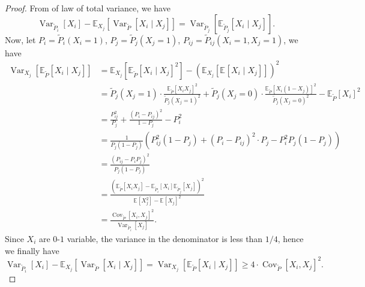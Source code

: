 \begin{proof}
	From of law of total variance, we have
	\[
		\mathop{\mathrm{Var}}\nolimits_{\widetilde{P} _i}\left[X_i \right]  - \mathbb{E}_{X_j}\left[\mathop{\mathrm{Var}}\nolimits_{\widetilde{P} }\left[X_i \mid X_j \right]  \right] = \mathop{\mathrm{Var}}\nolimits_{\widetilde{P} _{j}}\left[\mathbb{E}_{\widetilde{P} _j}\left[X_i \mid X_j \right]  \right] .
	\]
	Now, let \(P_i = \widetilde{P} _i(X_i = 1)\), \(P_j= \widetilde{P} _j(X_j = 1)\), \(P_{ij}= \widetilde{P} _{ij}(X_i=1, X_j=1) \), we have
	\[
		\begin{split}
			\mathop{\mathrm{Var}}\nolimits_{X_j}\left[\mathbb{E}_{\widetilde{P} }\left[X_i \mid X_j \right] \right]
			&= \mathbb{E}_{X_j}\left[\mathbb{E}_{\widetilde{P} }\left[X_i \mid X_j \right] ^{2} \right] - \left( \mathbb{E}_{X_j}\left[ \mathbb{E}_{}\left[X_i\mid X_j \right] \right]  \right)^{2} \\
			&=\widetilde{P} _j(X_j = 1)\cdot \frac{\mathbb{E}_{\widetilde{P} }\left[X_i X_j \right]^{2}}{\widetilde{P} _j(X_j = 1)^{2}} + \widetilde{P} _j(X_j = 0)\cdot \frac{\mathbb{E}_{\widetilde{P} }\left[X_i (1-X_j) \right]^{2}}{\widetilde{P} _j(X_j = 0)^{2}} - \mathbb{E}_{\widetilde{P} }\left[ X_i\right] ^{2} \\
			&=\frac{P_{ij} ^{2} }{P_j} + \frac{(P_i - P_{ij} )^{2} }{1-P_j}- P_i ^{2} \\
			&=\frac{1}{P_j(1-P_j)} \left( P_{ij}^{2} (1-P_j) + (P_i - P_{ij} )^{2} \cdot P_j - P_i ^{2} P_j(1-P_j)  \right)\\
			&= \frac{(P_{ij} - P_i P_j)^{2} }{P_j(1-P_j)}\\
			&= \frac{\left( \mathbb{E}_{\widetilde{P} }\left[ X_i X_j\right] - \mathbb{E}_{\widetilde{P} _i}\left[ X_i\right] \mathbb{E}_{\widetilde{P} _j}\left[X_j \right] \right) ^{2} }{\mathbb{E}_{}\left[X_j^2 \right] - \mathbb{E}_{}\left[X_j \right] ^{2} }\\
			&= \frac{\mathop{\mathrm{Cov}}\nolimits_{\widetilde{P} }\left[X_i, X_j \right]^{2}  }{\mathop{\mathrm{Var}}\nolimits_{\widetilde{P} _i}\left[X_j \right] }.
		\end{split}
	\]
	Since \(X_i\) are \(0\)-\(1\) variable, the variance in the denominator is less than \(1 / 4\), hence we finally have
	\[
		\mathop{\mathrm{Var}}\nolimits_{\widetilde{P} _i}\left[X_i \right]  - \mathbb{E}_{X_j}\left[\mathop{\mathrm{Var}}\nolimits_{\widetilde{P} }\left[X_i \mid X_j \right]  \right] = \mathop{\mathrm{Var}}\nolimits_{X_j}\left[ \mathbb{E}_{\widetilde{P} }\left[X_i \mid X_j \right] \right] \geq 4\cdot \mathop{\mathrm{Cov}}\nolimits_{\widetilde{P} }\left[X_i, X_j \right]^{2} .
	\]
\end{proof}

